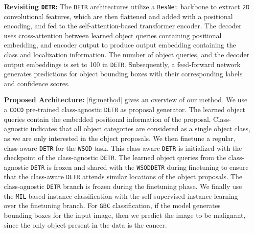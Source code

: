\documentclass[runningheads]{llncs}
\newcommand{\myfirstpara}[1]{\par \noindent \textbf{#1:}}
\newcommand{\mypara}[1]{ \myfirstpara{#1}}
\def\gbc{\texttt{GBC}\xspace}
\def\wsod{\texttt{WSOD}\xspace}
\def\mil{\texttt{MIL}\xspace}
\def\detr{\texttt{DETR}\xspace}
\begin{document}
\mypara{Revisiting \detr}
%
The \detr \cite{detr} architectures utilize a \texttt{ResNet} \cite{resnet} backbone to extract \texttt{2D} convolutional features, which are then flattened and added with a positional encoding, and fed to the self-attention-based transformer encoder. The decoder uses cross-attention between learned object queries containing positional embedding, and encoder output to produce output embedding containing the class and localization information. The number of object queries, and the decoder output embeddings is set to 100 in \detr. Subsequently, a feed-forward network generates predictions for object bounding boxes with their corresponding labels and confidence scores. 

\mypara{Proposed Architecture}
%
\cref{fig:method} gives an overview of our method. We use a \texttt{COCO} pre-trained class-agnostic \detr as proposal generator. The learned object queries contain the embedded positional information of the proposal. Class-agnostic indicates that all object categories are considered as a single object class, as we are only interested in the object proposals. We then finetune a regular, class-aware \detr for the \wsod task. This class-aware \detr is initialized with the checkpoint of the class-agnostic \detr. The learned object queries from the class-agnostic \detr is frozen and shared with the \wsod \detr during finetuning to ensure that the class-aware \detr attends similar locations of the object proposals. The class-agnostic \detr branch is frozen during the finetuning phase. We finally use the \mil-based instance classification with the self-supervised instance learning over the finetuning branch. For \gbc classification, if the model generates bounding boxes for the input image, then we predict the image to be malignant, since the only object present in the data is the cancer. 
\end{document}

